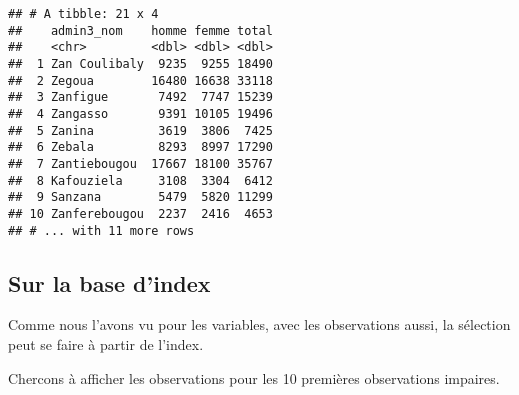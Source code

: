 \documentclass[]{book}
\newenvironment{Shaded}{\begin{snugshade}}{\end{snugshade}}
\newcommand{\KeywordTok}[1]{\textcolor[rgb]{0.13,0.29,0.53}{\textbf{#1}}}
\newcommand{\DataTypeTok}[1]{\textcolor[rgb]{0.13,0.29,0.53}{#1}}
\newcommand{\DecValTok}[1]{\textcolor[rgb]{0.00,0.00,0.81}{#1}}
\newcommand{\StringTok}[1]{\textcolor[rgb]{0.31,0.60,0.02}{#1}}
\newcommand{\CommentTok}[1]{\textcolor[rgb]{0.56,0.35,0.01}{\textit{#1}}}
\newcommand{\OperatorTok}[1]{\textcolor[rgb]{0.81,0.36,0.00}{\textbf{#1}}}
\newcommand{\NormalTok}[1]{#1}
\begin{document}
\begin{Shaded}
\end{Shaded}

\begin{verbatim}
## # A tibble: 21 x 4
##    admin3_nom    homme femme total
##    <chr>         <dbl> <dbl> <dbl>
##  1 Zan Coulibaly  9235  9255 18490
##  2 Zegoua        16480 16638 33118
##  3 Zanfigue       7492  7747 15239
##  4 Zangasso       9391 10105 19496
##  5 Zanina         3619  3806  7425
##  6 Zebala         8293  8997 17290
##  7 Zantiebougou  17667 18100 35767
##  8 Kafouziela     3108  3304  6412
##  9 Sanzana        5479  5820 11299
## 10 Zanferebougou  2237  2416  4653
## # ... with 11 more rows
\end{verbatim}

\subsection{Sur la base d'index}\label{sur-la-base-dindex}

Comme nous l'avons vu pour les variables, avec les observations aussi,
la sélection peut se faire à partir de l'index.

Chercons à afficher les observations pour les 10 premières observations
impaires.
\end{document}
